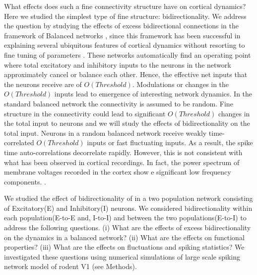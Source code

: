 What effects does such a fine connectivity structure have on cortical dynamics? Here we studied the simplest type of fine structure: bidirectionality. We address the question by studying the effects of excess bidirectional connections in the framework of Balanced networks \cite{carl1996, carl1998, carl2004}, since this framework has been successful in explaining several ubiquitous features of cortical dynamics without resorting to fine tuning of parameters \cite{softky1993, Holt1996, roxin2011}. These networks automatically find an operating point where total excitatory and inhibitory inputs to the neurons in the network approximately cancel or balance each other.  Hence, the effective net inputs that the neurons receive are of $O(Threshold)$. Modulations or changes in the $O(Threshold)$ inputs lead to emergence of interesting network dynamics. In the standard balanced network the connectivity is assumed to be random. Fine structure in the connectivity could lead to significant $O(Threshold)$ changes in the total input to neurons and we will study the effects of bidirectionality on the total input. Neurons in a random balanced network receive weakly time-correlated $O(Threshold)$ inputs or fast fluctuating inputs. As a result, the spike time auto-correlations decorrelate rapidly\cite{carl1996, carl1998}.  However, this is not consistent with what has been observed in cortical recordings. In fact, the power spectrum of membrane voltages recorded in the cortex show e significant low frequency components. \cite{Tan2014}. 						

We studied the effect of bidirectionality of in a two population network consisting of Excitatory(E) and Inhibitory(I) neurons. We considered bidirectionality within each population(E-to-E and, I-to-I) and between the two populations(E-to-I) to address the following questions. (i) What are the effects of excess bidirectionality on the dynamics in a balanced network? (ii) What are the effects on functional properties? (iii) What are the effects on fluctuations and spiking statistics?
We investigated these questions using numerical simulations of large scale spiking network  model of rodent V1 (see Methods). 
 





